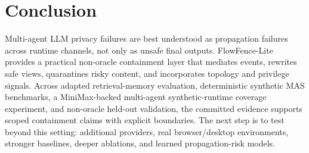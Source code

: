 
\section{Conclusion}

Multi-agent LLM privacy failures are best understood as propagation failures across runtime channels, not only as unsafe final outputs. FlowFence-Lite provides a practical non-oracle containment layer that mediates events, rewrites safe views, quarantines risky content, and incorporates topology and privilege signals. Across adapted retrieval-memory evaluation, deterministic synthetic MAS benchmarks, a MiniMax-backed multi-agent synthetic-runtime coverage experiment, and non-oracle held-out validation, the committed evidence supports scoped containment claims with explicit boundaries. The next step is to test beyond this setting: additional providers, real browser/desktop environments, stronger baselines, deeper ablations, and learned propagation-risk models.
